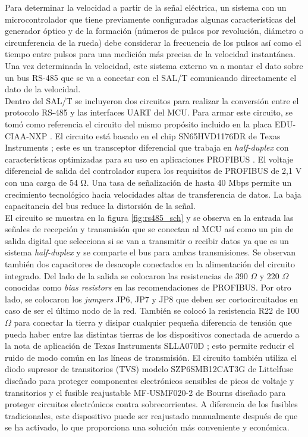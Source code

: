 Para determinar la velocidad a partir de la señal eléctrica, un sistema con un microcontrolador que tiene previamente configuradas algunas características del generador óptico y de la formación (números de pulsos por revolución, diámetro o circunferencia de la rueda) debe considerar la frecuencia de los pulsos así como el tiempo entre pulsos para una medición más precisa de la velocidad instantánea. Una vez determinada la velocidad, este sistema externo va a montar el dato sobre un bus RS-485 que se va a conectar con el SAL/T comunicando directamente el dato de la velocidad. \\ 


Dentro del SAL/T se incluyeron dos circuitos para realizar la conversión entre el protocolo RS-485 y las interfaces UART del MCU. Para armar este circuito, se tomó como referencia el circuito del mismo propósito incluido en la placa EDU-CIAA-NXP \cite{edu-ciaa}. El circuito está basado en el chip SN65HVD1176DR de Texas Instruments \cite{SN65HVD1176DR}; este es un  transceptor diferencial que trabaja en \textit{half-duplex} con características optimizadas para su uso en aplicaciones PROFIBUS \cite{profibus}. El voltaje diferencial de salida del controlador supera los requisitos de PROFIBUS de 2,1 V con una carga de 54 Ω. Una tasa de señalización de hasta 40 Mbps permite un crecimiento tecnológico hacia velocidades altas de transferencia de datos. La baja capacitancia del bus reduce la distorsión de la señal. \\

El circuito se muestra en la figura \ref{fig:rs485_sch} y se observa en la entrada las señales de recepción y transmisión que se conectan al MCU así como un pin de salida digital que selecciona si se van a transmitir o recibir datos ya que es un sistema \textit{half-duplex} y se comparte el bus para ambas transmisiones. Se observan también dos capacitores de desacople conectados en la alimentación del circuito integrado. Del lado de la salida se colocaron las resistencias de 390 $\Omega$ y 220 $\Omega$ conocidas como \textit{bias resistors} en las recomendaciones de PROFIBUS. Por otro lado, se colocaron los \textit{jumpers} JP6, JP7 y JP8 que deben ser cortocircuitados en caso de ser el último nodo de la red. También se colocó la resistencia R22 de 100 $\Omega$ para conectar la tierra y disipar cualquier pequeña diferencia de tensión que pueda haber entre las distintas tierras de los dispositivos conectada de acuerdo a la nota de aplicación de Texas Instruments SLLA070D \cite{rs485}; esto permite reducir el ruido de modo común en las líneas de transmisión. El circuito también utiliza el diodo supresor de transitorios (TVS) modelo SZP6SMB12CAT3G de Littelfuse \cite{SZP6SMB12CAT3G} diseñado para proteger componentes electrónicos sensibles de picos de voltaje y transitorios y el fusible reajustable MF-USMF020-2 de Bourns \cite{MF-USMF020-2} diseñado para proteger circuitos electrónicos contra sobrecorrientes. A diferencia de los fusibles tradicionales, este dispositivo puede ser reajustado manualmente después de que se ha activado, lo que proporciona una solución más conveniente y económica.




